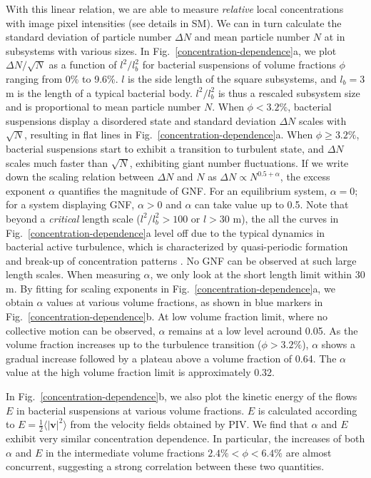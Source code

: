 \documentclass[twocolumn,aps,prl,amsmath,amssymb,longbibliography]{revtex4-2}
\begin{document}
With this linear relation, we are able to measure \emph{relative} local concentrations with image pixel intensities (see details in SM). We can in turn calculate the standard deviation of particle number $\Delta N$ and mean particle number $N$ at in subsystems with various sizes. In Fig.~\ref{concentration-dependence}a, we plot $\Delta N / \sqrt N$ as a function of $l^2/l_b^2$ for bacterial suspensions of volume fractions $\phi$ ranging from 0\% to 9.6\%.
$l$ is the side length of the square subsystems, and $l_b=3$ \textmu m is the length of a typical bacterial body. $l^2/l_b^2$ is thus a rescaled subsystem size and is proportional to mean particle number $N$.
When $\phi<3.2\%$, bacterial suspensions display a disordered state and standard deviation $\Delta N$ scales with $\sqrt N$, resulting in flat lines in Fig.~\ref{concentration-dependence}a.
When $\phi\ge3.2\%$, bacterial suspensions start to exhibit a transition to turbulent state, and $\Delta N$ scales much faster than $\sqrt N$, exhibiting giant number fluctuations.
If we write down the scaling relation between $\Delta N$ and $N$ as $\Delta N \propto N^{0.5+\alpha}$, the excess exponent $\alpha$ quantifies the magnitude of GNF.
For an equilibrium system, $\alpha=0$; for a system displaying GNF, $\alpha>0$ and $\alpha$ can take value up to 0.5.
Note that beyond a \emph{critical} length scale ($l^2/l_b^2>100$ or $l>30$ \textmu m), the all the curves in Fig.~\ref{concentration-dependence}a level off due to the typical dynamics in bacterial active turbulence, which is characterized by quasi-periodic formation and break-up of concentration patterns \cite{Saintillan2012}. No GNF can be observed at such large length scales. When measuring $\alpha$, we only look at the short length limit within 30 \textmu m.
By fitting for scaling exponents in Fig.~\ref{concentration-dependence}a, we obtain $\alpha$ values at various volume fractions, as shown in blue markers in Fig.~\ref{concentration-dependence}b.
At low volume fraction limit, where no collective motion can be observed, $\alpha$ remains at a low level acround 0.05.
As the volume fraction increases up to the turbulence transition ($\phi>3.2\%$), $\alpha$ shows a gradual increase followed by a plateau above a volume fraction of 0.64.
The $\alpha$ value at the high volume fraction limit is approximately 0.32.

In Fig.~\ref{concentration-dependence}b, we also plot the kinetic energy of the flows $E$ in bacterial suspensions at various volume fractions.
$E$ is calculated according to $E = \frac{1}{2}\langle|\boldsymbol{v}|^2 \rangle$ from the velocity fields obtained by PIV.
We find that $\alpha$ and $E$ exhibit very similar concentration dependence. In particular, the increases of both $\alpha$ and $E$ in the intermediate volume fractions $2.4\%<\phi<6.4\%$ are almost concurrent, suggesting a strong correlation between these two quantities.
\end{document}
